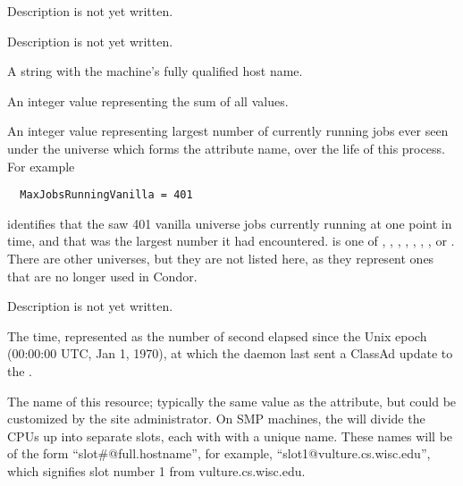 \begin{description}
\item[\AdAttr{HostsUnclaimed}:] Description is not yet written.

\item[\AdAttr{IdleJobs}:] Description is not yet written.

\item[\AdAttr{Machine}:] A string with the machine's fully qualified 
  host name.

\item[\AdAttr{MaxJobsRunning<universe}:] An integer value representing 
  the sum of all  values.

\item[\AdAttr{MaxJobsRunning<universe>}:] An integer value representing 
  largest number of currently running jobs ever seen
  under the universe which forms the attribute name, 
  over the life of this  process.
  For example
\begin{verbatim}
  MaxJobsRunningVanilla = 401
\end{verbatim}
  identifies that the  saw 401 vanilla universe jobs
  currently running at one point in time, and that was the largest
  number it had encountered.
   is one of 
  , , , ,
  , , , or .
  There are other universes, but they are not listed here, as they represent
  ones that are no longer used in Condor.

\item[\AdAttr{MyAddress}:] Description is not yet written.

\item[\AdAttr{MyCurrentTime}:]  The time, represented as the number of 
  second elapsed since the Unix epoch (00:00:00 UTC, Jan 1, 1970),
  at which the  daemon last sent a ClassAd update to the
  .

\item[\AdAttr{Name}:] The name of this resource; typically the same value as
  the  attribute, but could be customized by the site
  administrator.
  On SMP machines, the  will divide the CPUs up into separate
  slots, each with with a unique name.
  These names will be of the form ``slot\#@full.hostname'', for example,
  ``slot1@vulture.cs.wisc.edu'', which signifies slot number 1 from
  vulture.cs.wisc.edu.


\end{description}
